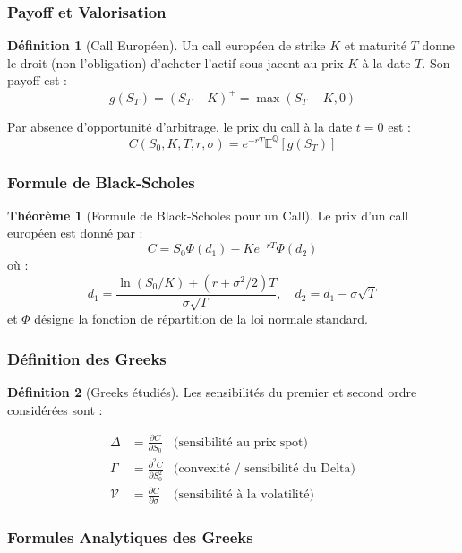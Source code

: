 \documentclass[a4paper,11pt]{article}
\theoremstyle{definition}
\newtheorem{definition}{Définition}[section]
\newtheorem{theoreme}{Théorème}[section]
\begin{document}
\subsubsection{Payoff et Valorisation}

\begin{definition}[Call Européen]
Un call européen de strike $K$ et maturité $T$ donne le droit (non l'obligation) d'acheter l'actif sous-jacent au prix $K$ à la date $T$. Son payoff est :
$$g(S_T) = (S_T - K)^+ = \max(S_T - K, 0)$$
\end{definition}

Par absence d'opportunité d'arbitrage, le prix du call à la date $t=0$ est :
$$C(S_0, K, T, r, \sigma) = e^{-rT} \mathbb{E}^{\mathbb{Q}}[g(S_T)]$$

\subsubsection{Formule de Black-Scholes}

\begin{theoreme}[Formule de Black-Scholes pour un Call]
Le prix d'un call européen est donné par :
$$C = S_0 \Phi(d_1) - K e^{-rT} \Phi(d_2)$$
où :
$$d_1 = \frac{\ln(S_0/K) + (r + \sigma^2/2)T}{\sigma\sqrt{T}}, \quad d_2 = d_1 - \sigma\sqrt{T}$$
et $\Phi$ désigne la fonction de répartition de la loi normale standard.
\end{theoreme}

\subsubsection{Définition des Greeks}

\begin{definition}[Greeks étudiés]
Les sensibilités du premier et second ordre considérées sont :

\begin{align}
\Delta &= \frac{\partial C}{\partial S_0} & \text{(sensibilité au prix spot)} \\[0.3cm]
\Gamma &= \frac{\partial^2 C}{\partial S_0^2} & \text{(convexité / sensibilité du Delta)} \\[0.3cm]
\mathcal{V} &= \frac{\partial C}{\partial \sigma} & \text{(sensibilité à la volatilité)}
\end{align}
\end{definition}

\subsubsection{Formules Analytiques des Greeks}
\end{document}
